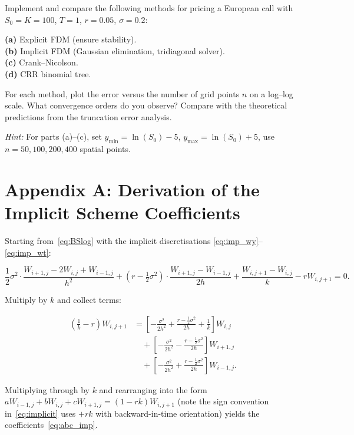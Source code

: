 \documentclass[12pt,a4paper]{article}
\theoremstyle{plain}
\theoremstyle{definition}
\theoremstyle{remark}
\begin{document}
\begin{hwbox}
Implement and compare the following methods for pricing a European call
with $S_{0}=K=100$, $T=1$, $r=0.05$, $\sigma=0.2$:

\textbf{(a)} Explicit FDM (ensure stability).\\
\textbf{(b)} Implicit FDM (Gaussian elimination, tridiagonal solver).\\
\textbf{(c)} Crank--Nicolson.\\
\textbf{(d)} CRR binomial tree.

For each method, plot the error versus the number of grid points $n$
on a log--log scale.  What convergence orders do you observe?
Compare with the theoretical predictions from the truncation error analysis.

\emph{Hint:} For parts (a)--(c), set $y_{\min}=\ln(S_{0})-5$,
$y_{\max}=\ln(S_{0})+5$, use $n=50,100,200,400$ spatial points.
\end{hwbox}

\appendix

\section{Appendix A: Derivation of the Implicit Scheme Coefficients}
\label{app:imp}

Starting from~\eqref{eq:BSlog} with the implicit discretisations
\eqref{eq:imp_wy}--\eqref{eq:imp_wt}:

\[
  \frac{1}{2}\sigma^{2}\!\cdot\!
  \frac{W_{i+1,j}-2W_{i,j}+W_{i-1,j}}{h^{2}}
  +\!\left(r-\tfrac{1}{2}\sigma^{2}\right)\!\cdot\!
  \frac{W_{i+1,j}-W_{i-1,j}}{2h}
  +\frac{W_{i,j+1}-W_{i,j}}{k}-rW_{i,j+1}=0.
\]

Multiply by $k$ and collect terms:

\begin{align*}
  \left(\frac{1}{k}-r\right)W_{i,j+1}
  &= \left[-\frac{\sigma^{2}}{2h^{2}}+\frac{r-\tfrac{1}{2}\sigma^{2}}{2h}+\frac{1}{k}\right]W_{i,j}\\
  &\quad+\left[-\frac{\sigma^{2}}{2h^{2}}-\frac{r-\tfrac{1}{2}\sigma^{2}}{2h}\right]W_{i+1,j}\\
  &\quad+\left[-\frac{\sigma^{2}}{2h^{2}}+\frac{r-\tfrac{1}{2}\sigma^{2}}{2h}\right]W_{i-1,j}.
\end{align*}

Multiplying through by $k$ and rearranging into the form
$aW_{i-1,j}+bW_{i,j}+cW_{i+1,j}=(1-rk)W_{i,j+1}$
(note the sign convention in~\eqref{eq:implicit} uses $+rk$ with
backward-in-time orientation) yields the coefficients~\eqref{eq:abc_imp}.
\end{document}
